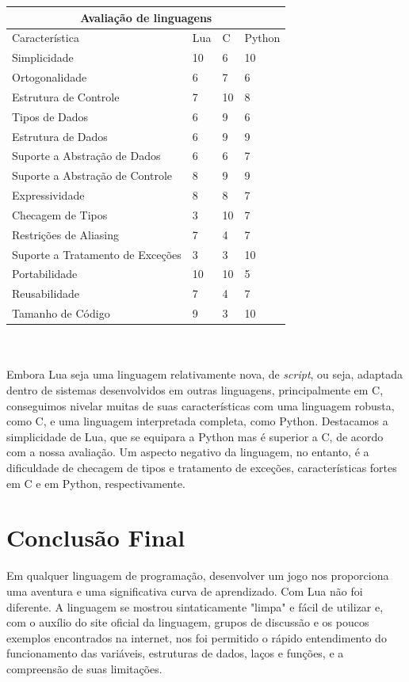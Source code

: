 \documentclass[rel_mlp]{iiufrgs}
\begin{document}
\begin{tabular}{ |p{6cm}||p{1.5cm}|p{1.5cm}|p{1.5cm}|  }
 \hline
 \multicolumn{4}{|c|}{Avaliação de linguagens} \\
 \hline
 Característica					& Lua 	&	C	&Python\\
 \hline
 Simplicidade   				& 10    &	6	&   10\\
 Ortogonalidade					& 6	 	& 	7  	&	6\\
 Estrutura de Controle 			& 7 	& 10	&  8\\
 Tipos de Dados    				& 6 	& 	9	&  6\\
 Estrutura de Dados				& 6  	&   9	&  9\\
 Suporte a Abstração de Dados	& 6  	&   6   &	7\\
 Suporte a Abstração de Controle& 8  	&   9	&   9\\
 Expressividade					& 8  	&   8	&   7\\
 Checagem de Tipos				& 3  	&  10 	&   7\\
 Restrições de Aliasing			& 7  	&  4	&  7\\
 Suporte a Tratamento de Exceções& 3  &  3		&  10\\
 Portabilidade					& 10  	& 10	& 5\\
 Reusabilidade					& 7  	& 4		& 7\\
 Tamanho de Código				& 9  	& 3		& 10\\
 \hline
\end{tabular}
\\ \\



Embora Lua seja uma linguagem relativamente nova, de \textit{script}, ou seja, adaptada dentro de sistemas desenvolvidos em outras linguagens, principalmente em C, conseguimos nivelar muitas de suas características com uma linguagem robusta, como C, e uma linguagem interpretada completa, como Python. Destacamos a simplicidade de Lua, que se equipara a Python mas é superior a C, de acordo com a nossa avaliação. Um aspecto negativo da linguagem, no entanto, é a dificuldade de checagem de tipos e tratamento de exceções, características fortes em C e em Python, respectivamente.


\chapter{Conclusão Final}

Em qualquer linguagem de programação, desenvolver um jogo nos proporciona uma aventura e uma significativa curva de aprendizado. Com Lua não foi diferente. A linguagem se mostrou sintaticamente "limpa" e fácil de utilizar e, com o auxílio do site oficial da linguagem, grupos de discussão e os poucos exemplos encontrados na internet, nos foi permitido o rápido entendimento do funcionamento das variáveis, estruturas de dados, laços e funções, e a compreensão de suas limitações.
\end{document}
